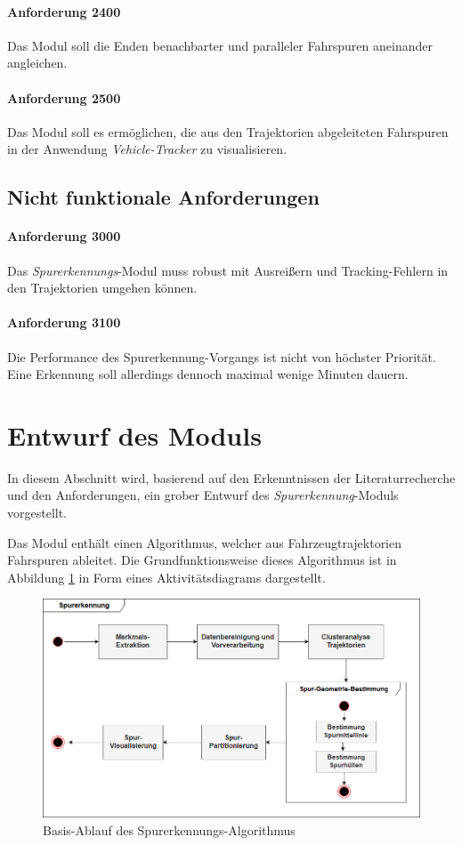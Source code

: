 \paragraph{Anforderung 2400}
Das Modul soll die Enden benachbarter und paralleler Fahrspuren aneinander angleichen.

\paragraph{Anforderung 2500}
Das Modul soll es ermöglichen, die aus den Trajektorien abgeleiteten Fahrspuren in der Anwendung \textit{Vehicle-Tracker}
zu visualisieren.

\subsection{Nicht funktionale Anforderungen}

\paragraph{Anforderung 3000}
Das \textit{Spurerkennungs}-Modul muss robust mit Ausreißern und Tracking-Fehlern in den Trajektorien umgehen können.

\paragraph{Anforderung 3100}
Die Performance des Spurerkennung-Vorgangs ist nicht von höchster Priorität. Eine Erkennung soll allerdings
dennoch maximal wenige Minuten dauern.


\section{Entwurf des Moduls}
\label{sec:design}

In diesem Abschnitt wird, basierend auf den Erkenntnissen der Literaturrecherche und den Anforderungen,
ein grober Entwurf des \textit{Spurerkennung}-Moduls vorgestellt.

Das Modul enthält einen Algorithmus, welcher aus Fahrzeugtrajektorien Fahrspuren ableitet.
Die Grundfunktionsweise dieses Algorithmus ist in Abbildung \ref{fig:concept_laneDetection_activity}
in Form eines Aktivitätsdiagrams dargestellt.

\begin{figure}[H]
    \centering
    \includegraphics[width=0.8\linewidth]{resources/img/konzeption/activity_laneDetection}
    \caption{Basis-Ablauf des Spurerkennungs-Algorithmus}
    \label{fig:concept_laneDetection_activity}
\end{figure}

